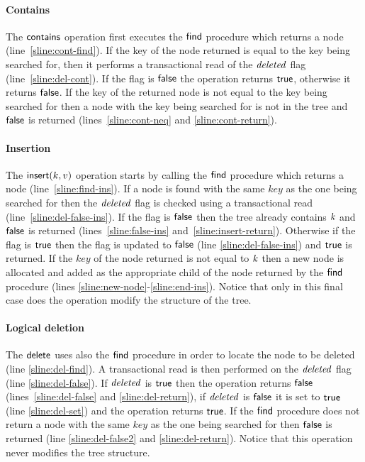\paragraph{Contains} 
The $\act{contains}$ operation first executes the $\act{find}$ procedure which returns a node (line~\ref{sline:cont-find}).
If the key of the node returned is equal to the key being searched for, then it performs a transactional read of the $\ms{deleted}$ flag (line~\ref{sline:del-cont}).
If the flag is $\lit{false}$ the operation returns $\lit{true}$, otherwise it returns $\lit{false}$.
If the key of the returned node is not equal to the key being searched for then a node with the key being searched for is not in the tree and $\lit{false}$ is returned (lines~\ref{sline:cont-neq} and \ref{sline:cont-return}).

\paragraph{Insertion} The $\act{insert}(k,v)$ operation starts by calling the $\act{find}$ procedure which returns a node (line~\ref{sline:find-ins}).
If a node is found with the same $key$ as the one being searched for then the $\ms{deleted}$ flag is checked using a transactional read (line~\ref{sline:del-false-ins}).
If the flag is $\lit{false}$ then the tree already contains $\ms{k}$ and $\lit{false}$ is returned (lines~\ref{sline:false-ins} and~\ref{sline:insert-return}).
Otherwise if the flag is $\lit{true}$ then the flag is updated to $\lit{false}$ (line \ref{sline:del-false-ins}) and $\lit{true}$ is returned.
If the $key$ of the node returned is not equal to $\ms{k}$ then a new node is allocated and added as the
appropriate child of the node returned by the $\act{find}$ procedure (lines \ref{sline:new-node}-\ref{sline:end-ins}).
Notice that only in this final case does the operation modify the structure of the tree.

\paragraph{Logical deletion} The $\act{delete}$ uses also the $\act{find}$ procedure in order to locate the node to be deleted (line \ref{sline:del-find}).
A transactional read is then performed on the $\ms{deleted}$ flag (line \ref{sline:del-false}).
If $\ms{deleted}$ is $\lit{true}$ then the operation returns $\lit{false}$ (lines~\ref{sline:del-false} and \ref{sline:del-return}), if $\ms{deleted}$
is $\lit{false}$ it is set to $\lit{true}$ (line \ref{sline:del-set}) and the operation returns $\lit{true}$.
If the $\act{find}$ procedure does not return a node with the same $key$ as the one being searched for then $\lit{false}$ is returned (line \ref{sline:del-false2} and \ref{sline:del-return}).
Notice that this operation never modifies the tree structure.

